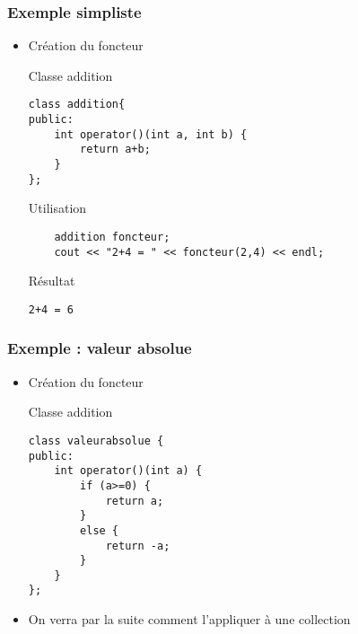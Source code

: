 \begin{frame}[fragile]\frametitle{Exemple simpliste}
\begin{itemize}
\item Création du foncteur
\begin{codeblock}{Classe addition}
\begin{lstlisting}
class addition{
public:
    int operator()(int a, int b) {
        return a+b;
    }
};
\end{lstlisting}
\end{codeblock}
\begin{codeblock}{Utilisation}
\begin{lstlisting}
    addition foncteur;
    cout << "2+4 = " << foncteur(2,4) << endl;
\end{lstlisting}
\end{codeblock}
\begin{block}{Résultat}
{\tiny
\begin{verbatim}
2+4 = 6
\end{verbatim}}
\end{block}
\end{itemize}
\end{frame}

\begin{frame}[fragile]\frametitle{Exemple : valeur absolue}
\begin{itemize}
\item Création du foncteur
\begin{codeblock}{Classe addition}
\begin{lstlisting}
class valeurabsolue {
public:
    int operator()(int a) {
        if (a>=0) {
            return a;
        }
        else {
            return -a;
        }
    }
};
\end{lstlisting}
\end{codeblock}
\item On verra par la suite comment l'appliquer à une collection
\end{itemize}
\end{frame}

